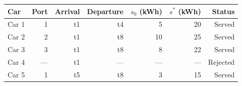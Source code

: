 \begin{tabular}{lrrrrrr}
\toprule
Car & Port & Arrival & Departure & $s_0$ (kWh) & $s^*$ (kWh) & Status \\
\midrule
Car 1 & 1 & t1 & t4 & 5 & 20 & Served \\
Car 2 & 2 & t1 & t8 & 10 & 25 & Served \\
Car 3 & 3 & t1 & t8 & 8 & 22 & Served \\
Car 4 & — & t1 & — & — & — & Rejected \\
Car 5 & 1 & t5 & t8 & 3 & 15 & Served \\
\bottomrule
\end{tabular}